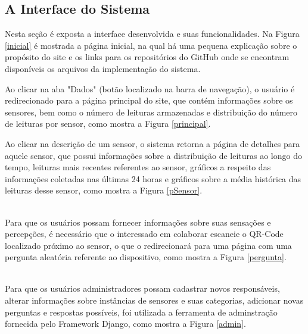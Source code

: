 \subsection{A Interface do Sistema}
\null \quad Nesta seção é exposta a interface desenvolvida e suas funcionalidades. Na Figura \ref{inicial}
é mostrada a página inicial, na qual há uma pequena explicação sobre o propósito do site e os links para os repositórios do GitHub onde se encontram disponíveis os arquivos da implementação do sistema.

\newpage
\null \quad Ao clicar na aba "Dados" (botão localizado na barra de navegação), o usuário é redirecionado para a página principal do site, que contém informações sobre os sensores, bem como o número de leituras armazenadas e distribuição do número de leituras por sensor, como mostra a Figura \ref{principal}.

\newpage
\null \quad Ao clicar na descrição de um sensor, o sistema retorna a página de detalhes para aquele sensor, que possui informações sobre a distribuição de leituras ao longo do tempo, leituras mais recentes referentes ao sensor, gráficos a respeito das informações coletadas nas últimas 24 horas e gráficos sobre a média histórica das leituras desse sensor, como mostra a Figura \ref{pSensor}.
\newpage
{}


\\\null \quad Para que os usuários possam fornecer informações sobre suas sensações e percepções, é necessário que o interessado em colaborar escaneie o QR-Code localizado próximo ao sensor, o que o redirecionará para uma página com uma pergunta aleatória referente ao dispositivo, como mostra a Figura \ref{pergunta}.


\\\null \quad Para que os usuários administradores possam cadastrar novos responsáveis, alterar informações sobre instâncias de sensores e suas categorias, adicionar novas perguntas e respostas possíveis, foi utilizada a ferramenta de adminstração fornecida pelo Framework Django, como mostra a Figura \ref{admin}.



